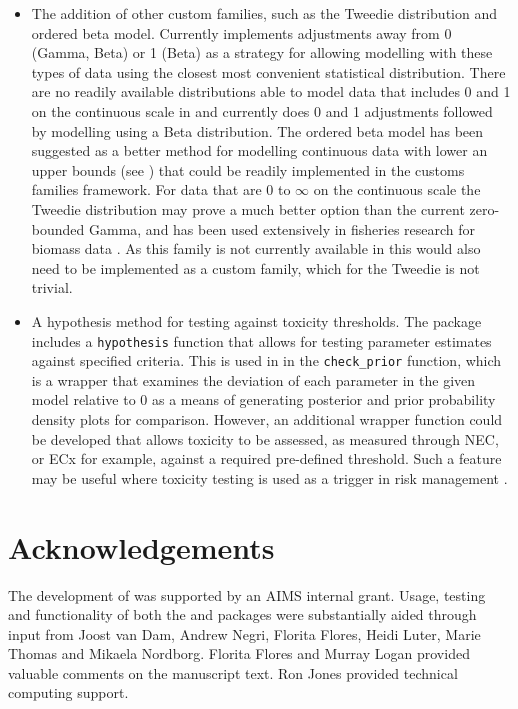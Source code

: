 \documentclass[
  shortnames]{jss}
\begin{document}
\begin{itemize}
\item
  The addition of other custom families, such as the Tweedie distribution and ordered beta model. Currently  implements adjustments away from 0 (Gamma, Beta) or 1 (Beta) as a strategy for allowing modelling with these types of data using the closest most convenient statistical distribution.
  There are no readily available distributions able to model data that includes 0 and 1 on the continuous scale in  and  currently does 0 and 1 adjustments followed by modelling using a Beta distribution. The ordered beta model has been suggested as a better method for modelling continuous data with lower an upper bounds (see \citet{Kubinec}) that could be readily implemented in the  customs families framework.
  For data that are 0 to \(\infty\) on the continuous scale the Tweedie distribution may prove a much better option than the current zero-bounded Gamma, and has been used extensively in fisheries research for biomass data \citep{Shono2008}. As this family is not currently available in  this would also need to be implemented as a custom family, which for the Tweedie is not trivial.
\item
  A hypothesis method for testing against toxicity thresholds. The  package includes a \texttt{hypothesis} function that allows for testing parameter estimates against specified criteria. This is used in  in the \texttt{check\_prior} function, which is a wrapper that examines the deviation of each parameter in the given model relative to 0 as a means of generating posterior and prior probability density plots for comparison. However, an additional wrapper function could be developed that allows toxicity to be assessed, as measured through NEC, or ECx for example, against a required pre-defined threshold. Such a feature may be useful where toxicity testing is used as a trigger in risk management \citep[for example, using whole-effluent-toxicity (WET) testing,][]{Karman2019}.
\end{itemize}

\hypertarget{acknowledgements}{%
\section{Acknowledgements}\label{acknowledgements}}

The development of  was supported by an AIMS internal grant. Usage, testing and functionality of both the  and  packages were substantially aided through input from Joost van Dam, Andrew Negri, Florita Flores, Heidi Luter, Marie Thomas and Mikaela Nordborg. Florita Flores and Murray Logan provided valuable comments on the manuscript text. Ron Jones provided technical computing support.

\renewcommand\refname{References}

\end{document}
